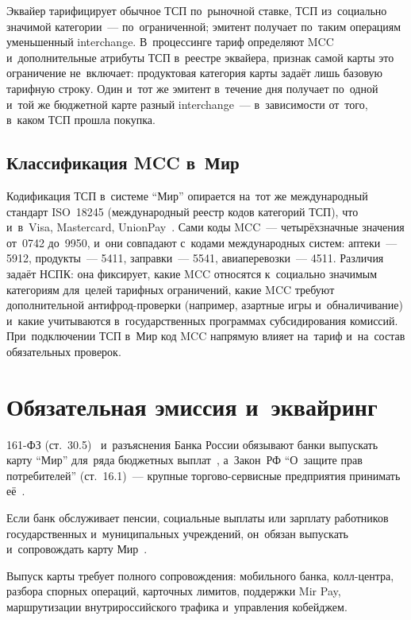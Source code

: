 Эквайер тарифицирует обычное ТСП по~рыночной ставке, ТСП из~социально
значимой категории~--- по~ограниченной; эмитент получает по~таким операциям
уменьшенный interchange. В~процессинге тариф определяют MCC
и~дополнительные атрибуты ТСП в~реестре эквайера, признак самой карты
это ограничение не~включает: продуктовая категория карты задаёт лишь базовую
тарифную строку. Один и~тот же эмитент в~течение дня получает по~одной и~той же
бюджетной карте разный interchange~--- в~зависимости от~того, в~каком ТСП
прошла покупка.

\subsection*{Классификация MCC в~Мир}

Кодификация ТСП в~системе \enquote{Мир} опирается на~тот же международный
стандарт ISO~18245 (международный реестр кодов категорий ТСП), что и~в~Visa,
Mastercard, UnionPay~\cite{iso-18245}. Сами коды MCC~--- четырёхзначные значения от~0742 до~9950, и~они совпадают
с~кодами международных систем: аптеки~--- 5912, продукты~--- 5411, заправки~---
5541, авиаперевозки~--- 4511. Различия задаёт НСПК: она фиксирует, какие MCC
относятся к~социально значимым категориям для~целей тарифных ограничений, какие
MCC требуют дополнительной антифрод-проверки (например, азартные игры
и~обналичивание) и~какие учитываются в~государственных
программах субсидирования комиссий. При~подключении ТСП в~Мир код MCC напрямую
влияет на~тариф и~на~состав обязательных проверок.

\section{Обязательная эмиссия и~эквайринг}\label{sec:mir-mandatory}

161-ФЗ (ст.~30.5)~\cite{fz-161} и~разъяснения Банка России обязывают банки
выпускать карту \enquote{Мир} для~ряда бюджетных выплат~\cite{cbr-nps-faq},
а~Закон~РФ \enquote{О~защите прав потребителей} (ст.~16.1)~--- крупные
торгово-сервисные предприятия принимать её~\cite{zozpp}.

Если банк обслуживает пенсии, социальные выплаты или зарплату работников
государственных и~муниципальных учреждений, он~обязан выпускать и~сопровождать
карту Мир~\cite{cbr-nps-faq}.

Выпуск карты требует полного сопровождения: мобильного банка, колл-центра,
разбора спорных операций, карточных лимитов, поддержки Mir Pay, маршрутизации
внутрироссийского трафика и~управления кобейджем.

